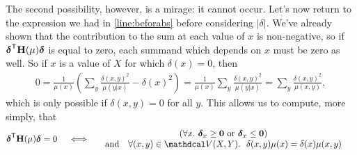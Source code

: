 \begin{subappendices}
\begin{lproof}
    The second possibility, however, is a mirage: it cannot occur.
    Let's now return to the expression we had in \eqref{line:beforabs} before considering $|\delta|$.
    We've already shown that the contribution to the sum at each value of $x$ is non-negative, so if ${\boldsymbol\delta}^{\sf T} \mathbf H(\mu) {\boldsymbol\delta}$ is equal to zero, each summand which depends on $x$ must be zero as well.
    So if $x$ is a value of $X$ for which $\delta(x) = 0$, then
    \begin{align*}
        0 = \frac{1}{\mu(x)} \left( \sum_y \frac{\delta(x,y)^2}{\mu(y|x)} - \delta(x)^2 \right)
         = \frac{1}{\mu(x)} \sum_y \frac{\delta(x,y)^2}{\mu(y|x)}
         = \sum_y \frac{\delta(x,y)^2}{\mu(x,y)},
    \end{align*}
    which is only possible if $\delta(x,y) = 0$ for all $y$.
    This allows us to compute, more simply, that
    \begin{align*}
        \bdelta^{\sf T} \mat H(\mu) \bdelta = 0
        \quad&\iff\quad
            \begin{array}{c}
            (\forall x .~  \bdelta_x \ge \mat 0 \text{ or } \bdelta_x \le \mat 0)
            \\\text{and}\quad
            \forall (x,y) \in \V(X,Y).~~
                \delta(x,y) \mu(x) = \delta(x) \mu(x,y)
            \end{array}
        \end{align*}



\end{lproof}
\end{subappendices}
